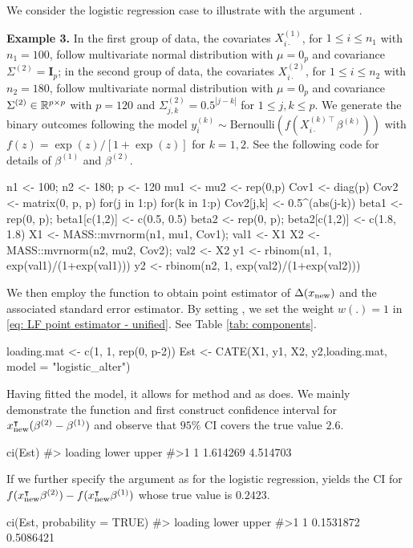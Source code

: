\noindent We consider the logistic regression case to illustrate  with the argument 
.

\noindent\textbf{Example 3.}
In the first group of data, the covariates $X_{i\cdot}^{(1)}$, for $1 \leq i \leq n_1$ with $n_1 = 100$, follow multivariate normal distribution with $\mu = 0_p$ and covariance $\Sigma^{(2)}=\mathbf{I}_p$; in the second group of data, the covariates $X_{i\cdot}^{(2)}$, for $1 \leq i \leq n_2$ with $n_2 = 180$, follow multivariate normal distribution with $\mu=0_p$ and covariance $\Sigma^{(2)} \in \mathbb{R}^{p\times p}$ with $p = 120$ and $\Sigma_{j,k}^{(2)} = 0.5^{|j-k|}$ for $1 \leq j,k \leq p$. We generate the binary outcomes following the model $y_i^{(k)} \sim \textrm{Bernoulli}(f(X_{i\cdot}^{(k)\intercal}\beta^{(k)}))$ with $f(z) = \exp(z)/[1+\exp(z)]$ for $k=1,2$. See the following code for details of $\beta^{(1)}$ and $\beta^{(2)}$.
\begin{example}
    n1 <- 100; n2 <- 180; p <- 120
    mu1 <- mu2 <- rep(0,p)
    Cov1 <- diag(p)
    Cov2 <- matrix(0, p, p)
    for(j in 1:p) for(k in 1:p) Cov2[j,k] <- 0.5^(abs(j-k))
    beta1 <- rep(0, p); beta1[c(1,2)] <- c(0.5, 0.5)
    beta2 <- rep(0, p); beta2[c(1,2)] <- c(1.8, 1.8)
    X1 <- MASS::mvrnorm(n1, mu1, Cov1); val1 <- X1%
    X2 <- MASS::mvrnorm(n2, mu2, Cov2); val2 <- X2%
    y1 <- rbinom(n1, 1, exp(val1)/(1+exp(val1)))
    y2 <- rbinom(n2, 1, exp(val2)/(1+exp(val2)))
\end{example}

\noindent We then employ the function  to obtain point estimator of $\Delta(x_{\rm new})$ and the associated standard error estimator. By setting , we set the weight $w(.) =1$ in \eqref{eq: LF point estimator - unified}. See Table \ref{tab: components}. 
\begin{example}
    loading.mat <- c(1, 1, rep(0, p-2))
    Est <- CATE(X1, y1, X2, y2,loading.mat, model = "logistic_alter")
\end{example}

\noindent Having fitted the model, it allows for method  and  as  does. We mainly demonstrate the  function and first construct confidence interval for $x_{\rm new}^\intercal (\beta^{(2)} - \beta^{(1)})$ and observe that $95\%$ CI covers the true value $2.6$.
\begin{example}
    ci(Est)
    #>  loading    lower    upper
    #>1       1 1.614269 4.514703
\end{example}
If we further specify the argument  as  for the logistic regression,  yields the CI for $f(x_{\rm new}^\intercal \beta^{(2)}) - f(x_{\rm new}^\intercal \beta^{(1)})$ whose true value is $0.2423$.
\begin{example}
    ci(Est, probability = TRUE)
    #>  loading     lower     upper
    #>1       1 0.1531872 0.5086421
\end{example}

